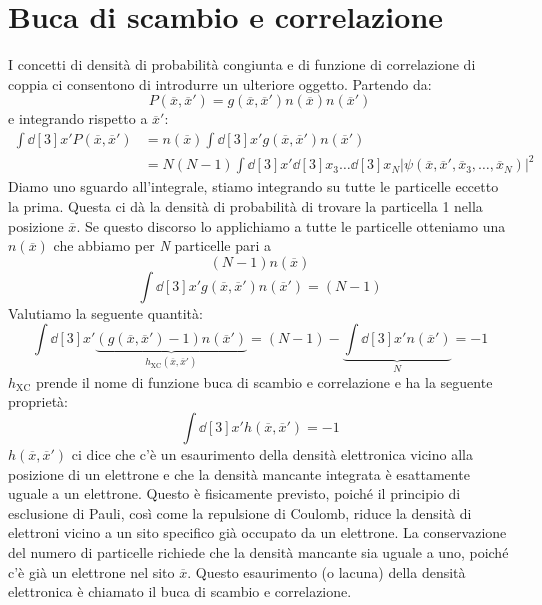 \section{Buca di scambio e correlazione}
I concetti di densità di probabilità congiunta e di funzione di correlazione di coppia ci consentono di introdurre un ulteriore oggetto. Partendo da:
\begin{equation*}
    P(\overline x, \overline{x}')=g(\overline x, \overline{x}')n(\overline x)n(\overline{x}')
\end{equation*}
e integrando rispetto a $\overline{x}'$:
\begin{equation*}
    \begin{aligned}
        \int \dd[3]{x'}P(\overline x, \overline{x}') &= n(\overline x)\int \dd[3]{x'} g(\overline x, \overline{x}')n(\overline{x}') \\
        & = N(N-1)\int\dd[3]{x'}\dd[3]{x}_3\dots\dd[3]{x}_N|\psi(\overline x, \overline{x}', \overline{x}_3, \dots, \overline{x}_N)|^2
    \end{aligned}
\end{equation*}
Diamo uno sguardo all'integrale, stiamo integrando su tutte le particelle eccetto la prima. Questa ci dà la densità di probabilità di trovare la particella 1 nella posizione $\overline x$. Se questo discorso lo applichiamo a tutte le particelle otteniamo una $n(\overline x)$ che abbiamo per \textit{N} particelle pari a
\begin{equation*}
    (N-1)n(\overline x)
\end{equation*}
\begin{equation*}
    \int \dd[3]{x'}g(\overline x, \overline{x}')n(\overline{x}')=(N-1)
\end{equation*}
Valutiamo la seguente quantità:
\begin{equation*}
    \int \dd[3]{x'}\underbrace{(g(\overline x, \overline{x}')-1)n(\overline{x}')}_{h_{\text{XC}}(\overline x, \overline{x}')}=(N-1)-\underbrace{\int \dd[3]{x'}n(\overline{x}')}_{N}=-1
\end{equation*}
$h_{\text{XC}}$ prende il nome di funzione buca di scambio e correlazione e ha la seguente proprietà:
\begin{equation*}
    \int \dd[3]{x'}h(\overline x, \overline{x}')=-1
\end{equation*}
$h(\overline x, \overline{x}')$ ci dice che c'è un esaurimento della densità elettronica vicino alla posizione di un elettrone e che la densità mancante integrata è esattamente uguale a un elettrone. Questo è fisicamente previsto, poiché il principio di esclusione di Pauli, così come la repulsione di Coulomb, riduce la densità di elettroni vicino a un sito specifico già occupato da un elettrone. La conservazione del numero di particelle richiede che la densità mancante sia uguale a uno, poiché c'è già un elettrone nel sito $\overline x$. Questo esaurimento (o lacuna) della densità elettronica è chiamato il buca di scambio e correlazione. \\
